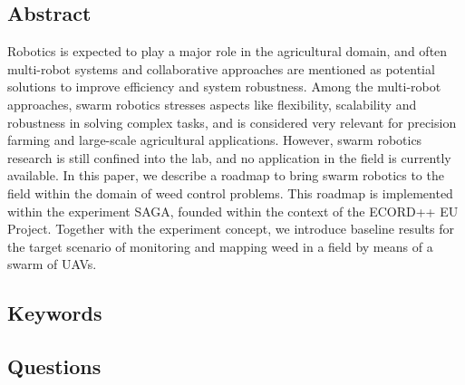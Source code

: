 \subsection*{Abstract}
Robotics is expected to play a major role in the agricultural domain, and often multi-robot systems and collaborative approaches are mentioned as potential solutions
to improve efficiency and system robustness. Among the
multi-robot approaches, swarm robotics stresses aspects
like flexibility, scalability and robustness in solving complex
tasks, and is considered very relevant for precision farming
and large-scale agricultural applications. However, swarm
robotics research is still confined into the lab, and no application in the field is currently available. In this paper,
we describe a roadmap to bring swarm robotics to the field
within the domain of weed control problems. This roadmap
is implemented within the experiment SAGA, founded within
the context of the ECORD++ EU Project. Together with the
experiment concept, we introduce baseline results for the
target scenario of monitoring and mapping weed in a field
by means of a swarm of UAVs.

\subsection*{Keywords}

\subsection*{Questions}
